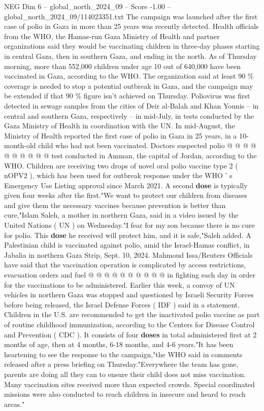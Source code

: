 \begin{textsample}{NEG Dim 6 – global\_north\_2024\_09 – Score -1.00 – global\_north\_2024\_09/114023351.txt}  \label{ex:f6_neg_024}
The campaign was launched after the first case of polio in Gaza in more than 25 years was recently detected.
Health officials from the WHO, the Hamas-run Gaza Ministry of Health and partner organizations said they would be vaccinating children in three-day phases starting in central Gaza, then in southern Gaza, and ending in the north.
As of Thursday morning, more than 552,000 children under age 10 out of 640,000 have been vaccinated in Gaza, according to the WHO.
The organization said at least 90 \% coverage is needed to stop a potential outbreak in Gaza, and the campaign may be extended if that 90 \% figure isn't achieved on Thursday.
Poliovirus was first detected in sewage samples from the cities of Deir al-Balah and Khan Younis -- in central and southern Gaza, respectively -- in mid-July, in tests conducted by the Gaza Ministry of Health in coordination with the UN.
In mid-August, the Ministry of Health reported the first case of polio in Gaza in 25 years, in a 10-month-old child who had not been vaccinated.
Doctors suspected polio @ @ @ @ @ @ @ @ @ @ test conducted in Amman, the capital of Jordan, according to the WHO.
Children are receiving two drops of novel oral polio vaccine type 2 ( nOPV2 ), which has been used for outbreak response under the WHO ' s Emergency Use Listing approval since March 2021.
A second \textbf{dose} is typically given four weeks after the first."We want to protect our children from diseases and give them the necessary vaccines because prevention is better than cure,"Islam Saleh, a mother in northern Gaza, said in a video issued by the United Nations ( UN ) on Wednesday."I fear for my son because there is no cure for polio.
This \textbf{dose} he received will protect him, and it is safe,"Saleh added.
A Palestinian child is vaccinated against polio, amid the Israel-Hamas conflict, in Jabalia in northern Gaza Strip, Sept. 10, 2024.
Mahmoud Issa/Reuters Officials have said that the vaccination operation is complicated by access restrictions, evacuation orders and fuel @ @ @ @ @ @ @ @ @ @ in fighting each day in order for the vaccinations to be administered.
Earlier this week, a convoy of UN vehicles in northern Gaza was stopped and questioned by Israeli Security Forces before being released, the Israel Defense Forces ( IDF ) said in a statement.
Children in the U.S. are recommended to get the inactivated polio vaccine as part of routine childhood immunization, according to the Centers for Disease Control and Prevention ( CDC ).
It consists of four \textbf{doses} in total administered first at 2 months of age, then at 4 months, 6-18 months, and 4-6 years."It has been heartening to see the response to the campaign,"the WHO said in comments released after a press briefing on Thursday."Everywhere the team has gone, parents are doing all they can to ensure their child does not miss vaccination.
Many vaccination sites received more than expected crowds.
Special coordinated missions were also conducted to reach children in insecure and heard to reach areas."

\end{textsample}
